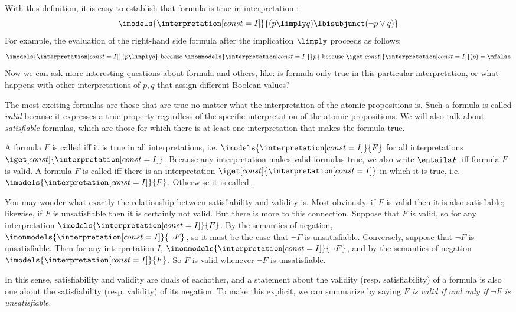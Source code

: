 \documentclass[11pt,twoside]{scrartcl}
\newcommand{\I}{\interpretation[const=I]}
\begin{document}
With this definition, it is easy to establish that formula  is true in interpretation :
\[
\imodels{\I}{(p \limply q) \lbisubjunct (\lnot p \lor q)}
\]
For example, the evaluation of the right-hand side formula after the implication $\limply$ proceeds as follows:
\[
\imodels{\I}{p \limply q}
~\text{because}~ \inonmodels{\I}{p}
~\text{because}~ \iget[const]{\I}(p)=\mfalse
\]
Now we can ask more interesting questions about formula  and others, like:
is formula  only true in this particular interpretation, or what happens with other interpretations of $p, q$ that assign different Boolean values?

The most exciting formulas are those that are true no matter what the interpretation of the atomic propositions is.
Such a formula is called \emph{valid} because it expresses a true property regardless of the specific interpretation of the atomic propositions. We will also talk about \emph{satisfiable} formulas, which are those for which there is at least one interpretation that makes the formula true.

\begin{definition}
  A formula $F$ is called  iff it is true in all interpretations, i.e. \(\imodels{\I}{F}\) for all interpretations $\iget[const]{\I}$.
  Because any interpretation makes valid formulas true, we also write \(\entails F\) iff formula $F$ is valid.
  A formula $F$ is called  iff there is an interpretation $\iget[const]{\I}$ in which it is true, i.e. \(\imodels{\I}{F}\).
  Otherwise it is called .
\end{definition}

You may wonder what exactly the relationship between satisfiability and validity is. Most obviously, if $F$ is valid then it is also satisfiable; likewise, if $F$ is unsatisfiable then it is certainly not valid. But there is more to this connection. 
Suppose that $F$ is valid, so for any interpretation $\imodels{\I}{F}$. By the semantics of negation, $\inonmodels{\I}{\lnot F}$, so it must be the case that $\lnot F$ is unsatisfiable. Conversely, suppose that $\lnot F$ is unsatisfiable. Then for any interpretation $I$, $\inonmodels{\I}{\lnot F}$, and by the semantics of negation $\imodels{\I}{F}$. So $F$ is valid whenever $\lnot F$ is unsatisfiable. 

In this sense, satisfiability and validity are duals of eachother, and a statement about the validity (resp. satisfiability) of a formula is also one about the satisfiability (resp. validity) of its negation. To make this explicit, we can summarize by saying \emph{$F$ is valid if and only if $\lnot F$ is unsatisfiable}.
\end{document}
